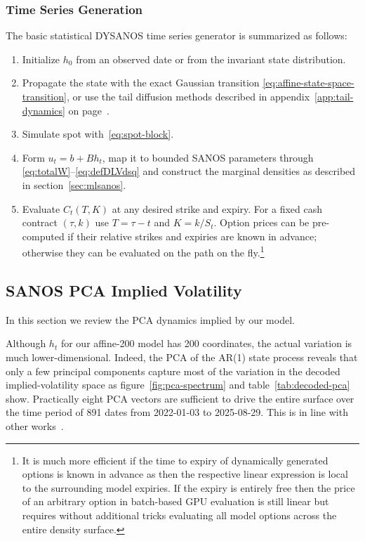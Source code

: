 \documentclass[11pt,a4paper]{article}
\begin{document}
\subsubsection{Time Series Generation}
\label{sec:simulation}

The basic statistical DYSANOS time series generator is summarized as follows:
\begin{enumerate}
  \item Initialize $h_0$ from an observed
        date or from the invariant state distribution.
  \item Propagate the state with the exact Gaussian transition
        \eqref{eq:affine-state-space-transition}, or use the tail diffusion methods described in appendix~\ref{app:tail-dynamics} on
        page~\pageref{app:tail-dynamics}.
  \item Simulate spot with~\eqref{eq:spot-block}.
  \item Form $u_t=b+B h_t$, map it to bounded SANOS parameters through
        \eqref{eq:totalW}--\eqref{eq:defDLVdsq}  and construct the marginal densities
        as described in section~\ref{sec:mlsanos}.
  \item Evaluate $C_t(T,K)$ at any desired strike and expiry. For a fixed 
        cash contract $(\tau,k)$ use $T=\tau-t$ and $K=k/S_t$. Option  prices can  be pre-computed
        if their relative strikes and expiries are known in advance; otherwise 
        they can be evaluated on the path on the fly.\footnote{
          It is much more efficient if the time to expiry of dynamically generated options is known in advance
          as then the respective linear expression is local to the surrounding model expiries. If the
          expiry is entirely free then the price of an arbitrary option in batch-based GPU evaluation is still linear
          but requires without additional tricks evaluating all model options across the entire density surface.
        }
\end{enumerate}



\subsection{SANOS PCA Implied Volatility}
\label{sec:pca}

In this section we review the PCA dynamics implied by our model.

Although $h_t$ for our affine-200 model has 200 coordinates, the actual variation is
much lower-dimensional.  Indeed, the PCA of the AR(1) state process reveals that only a few principal components capture most of the variation in the decoded
implied-volatility space as figure~\ref{fig:pca-spectrum} and table~\ref{tab:decoded-pca} show. Practically eight PCA vectors are sufficient to drive the entire surface over the
time period of 891 dates from 2022-01-03 to 2025-08-29. This is in line with other works~\citep{ContVol}.
\end{document}
